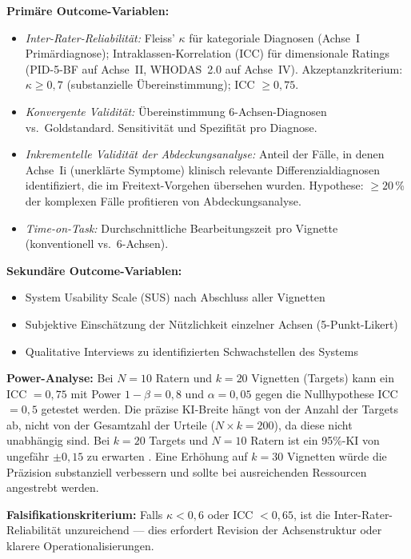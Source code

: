 \documentclass[11pt,a4paper]{article}
\begin{document}
\begin{description}[style=nextline, leftmargin=1.5cm, font=\bfseries]
\textbf{Prim\"are Outcome-Variablen:}
\begin{itemize}[leftmargin=*, noitemsep]
    \item \textit{Inter-Rater-Reliabilit\"at:} Fleiss' $\kappa$ f\"ur kategoriale Diagnosen (Achse~I Prim\"ardiagnose); Intraklassen-Korrelation (ICC) f\"ur dimensionale Ratings (PID-5-BF auf Achse~II, WHODAS~2.0 auf Achse~IV). Akzeptanzkriterium: $\kappa \geq 0{,}7$ (substanzielle \"Ubereinstimmung); ICC $\geq 0{,}75$.
    \item \textit{Konvergente Validit\"at:} \"Ubereinstimmung 6-Achsen-Diagnosen vs.\ Goldstandard. Sensitivit\"at und Spezifit\"at pro Diagnose.
    \item \textit{Inkrementelle Validit\"at der Abdeckungsanalyse:} Anteil der F\"alle, in denen Achse~Ii (unerkl\"arte Symptome) klinisch relevante Differenzialdiagnosen identifiziert, die im Freitext-Vorgehen \"ubersehen wurden. Hypothese: $\geq 20$\,\% der komplexen F\"alle profitieren von Abdeckungsanalyse.
    \item \textit{Time-on-Task:} Durchschnittliche Bearbeitungszeit pro Vignette (konventionell vs.\ 6-Achsen).
\end{itemize}

\textbf{Sekund\"are Outcome-Variablen:}
\begin{itemize}[leftmargin=*, noitemsep]
    \item System Usability Scale (SUS) nach Abschluss aller Vignetten
    \item Subjektive Einsch\"atzung der N\"utzlichkeit einzelner Achsen (5-Punkt-Likert)
    \item Qualitative Interviews zu identifizierten Schwachstellen des Systems
\end{itemize}

\textbf{Power-Analyse:} Bei $N = 10$ Ratern und $k = 20$ Vignetten (Targets) kann ein ICC $= 0{,}75$ mit Power $1 - \beta = 0{,}8$ und $\alpha = 0{,}05$ gegen die Nullhypothese ICC $= 0{,}5$ getestet werden. Die pr\"azise KI-Breite h\"angt von der Anzahl der Targets ab, nicht von der Gesamtzahl der Urteile ($N \times k = 200$), da diese nicht unabh\"angig sind. Bei $k = 20$ Targets und $N = 10$ Ratern ist ein 95\%-KI von ungef\"ahr $\pm 0{,}15$ zu erwarten \citep{Shrout1979}. Eine Erh\"ohung auf $k = 30$ Vignetten w\"urde die Pr\"azision substanziell verbessern und sollte bei ausreichenden Ressourcen angestrebt werden.

\textbf{Falsifikationskriterium:} Falls $\kappa < 0{,}6$ oder ICC $< 0{,}65$, ist die Inter-Rater-Reliabilit\"at unzureichend --- dies erfordert Revision der Achsenstruktur oder klarere Operationalisierungen.


\end{description}
\end{document}

